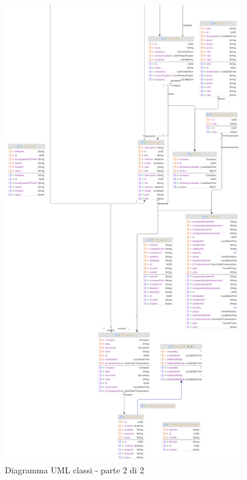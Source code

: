 \documentclass[a4paper,11pt]{article}
\begin{document}
\begin{figure}[H]
  \includegraphics[height=20cm]{img/model3_down.png}
  \caption{Diagramma UML classi - parte 2 di 2}
  \label{fig:schemaclassi2}
\end{figure}
\end{document}
